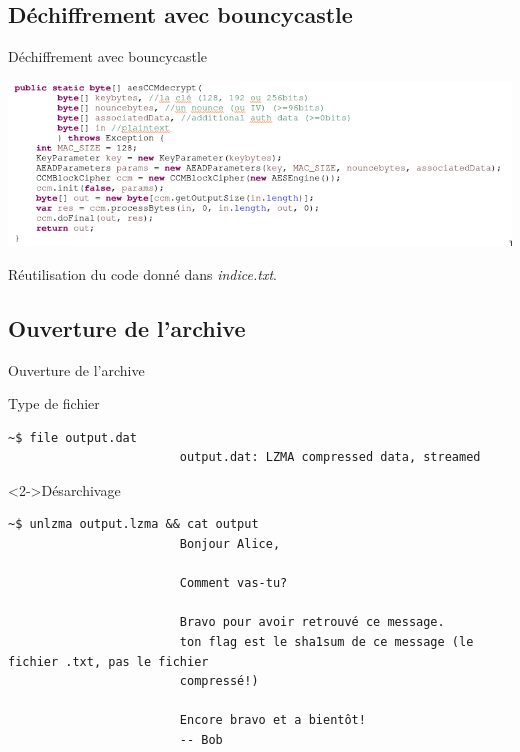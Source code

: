 \documentclass[10pt,sans,usenames,dvipsnames,french,compress]{beamer}
\begin{document}
\subsection{Déchiffrement avec bouncycastle}
\begin{frame}[fragile]{Déchiffrement avec bouncycastle}
	\begin{center}
		\includegraphics[width=0.95\linewidth]{120/eclipse.png}
	\end{center}
    Réutilisation du code donné dans \textit{indice.txt}.


\end{frame}

\subsection{Ouverture de l'archive}
\begin{frame}[fragile]{Ouverture de l'archive}
  \begin{block}{Type de fichier}
    \vspace{-3mm}
    \begin{lstlisting}[style=Term]
                        ~$ file output.dat
                        output.dat: LZMA compressed data, streamed
    \end{lstlisting}
    \vspace{-2mm}
  \end{block}
  \begin{block}<2->{Désarchivage}
    \vspace{-3mm}
    \begin{lstlisting}[style=Term]
                        ~$ unlzma output.lzma && cat output
                        Bonjour Alice,

                        Comment vas-tu?

                        Bravo pour avoir retrouvé ce message.
                        ton flag est le sha1sum de ce message (le fichier .txt, pas le fichier
                        compressé!)

                        Encore bravo et a bientôt!
                        -- Bob
    \end{lstlisting}
    \vspace{-2mm}
  \end{block}
\end{frame}
\end{document}
